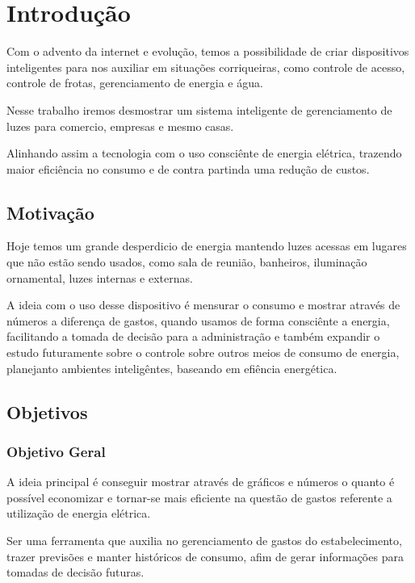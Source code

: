 \documentclass[openright]{normas-utf-tex} %
\begin{document}
\setcounter{page}{12}


\chapter{Introdução}


Com o advento da internet e evolução, temos a possibilidade de criar dispositivos inteligentes \cite{Novatec} para nos auxiliar em situações corriqueiras, como controle de acesso, controle de frotas, gerenciamento de energia e água.

Nesse trabalho iremos desmostrar um sistema inteligente de gerenciamento de luzes para comercio, empresas e mesmo casas.

Alinhando assim a tecnologia com o uso consciênte de energia elétrica, trazendo maior eficiência no consumo e de contra partinda uma redução de custos.

\section{Motivação}

Hoje temos um grande desperdicio de energia mantendo luzes acessas em lugares que não estão sendo usados, como sala de reunião, banheiros, iluminação ornamental, luzes internas e externas.

A ideia com o uso desse dispositivo é mensurar o consumo e mostrar através de números a diferença de gastos, quando usamos de forma consciênte a energia, facilitando a tomada de decisão para a administração e também expandir o estudo futuramente sobre o controle sobre outros meios de consumo de energia, planejanto ambientes inteligêntes, baseando em efiência energética.

\section{Objetivos}

\subsection{Objetivo Geral}

A ideia principal é conseguir mostrar através de gráficos e números o quanto é possível economizar e tornar-se mais eficiente na questão de gastos referente a utilização de energia elétrica.

Ser uma ferramenta que auxilia no gerenciamento de gastos do estabelecimento, trazer previsões e manter históricos de consumo, afim de gerar informações para tomadas de decisão futuras.
\end{document}
